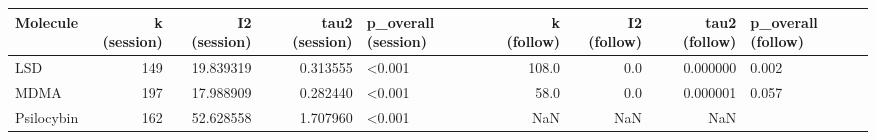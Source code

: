 \begin{tabular}{lrrrlrrrl}
\toprule
  Molecule &  k (session) &  I2 (session) &  tau2 (session) & p\_overall (session) &  k (follow) &  I2 (follow) &  tau2 (follow) & p\_overall (follow) \\
\midrule
       LSD &          149 &     19.839319 &        0.313555 &               <0.001 &       108.0 &          0.0 &       0.000000 &               0.002 \\
      MDMA &          197 &     17.988909 &        0.282440 &               <0.001 &        58.0 &          0.0 &       0.000001 &               0.057 \\
Psilocybin &          162 &     52.628558 &        1.707960 &               <0.001 &         NaN &          NaN &            NaN &                     \\
\bottomrule
\end{tabular}
